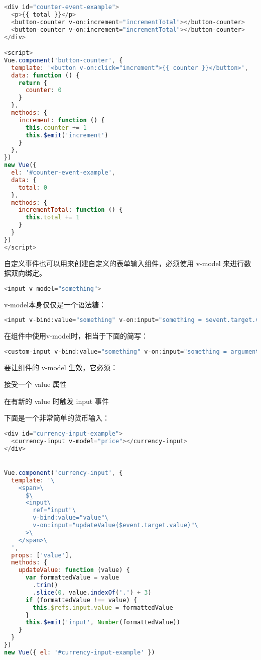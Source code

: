 \begin{lstlisting}[language=JavaScript]
<div id="counter-event-example">
  <p>{{ total }}</p>
  <button-counter v-on:increment="incrementTotal"></button-counter>
  <button-counter v-on:increment="incrementTotal"></button-counter>
</div>

<script>
Vue.component('button-counter', {
  template: '<button v-on:click="increment">{{ counter }}</button>',
  data: function () {
    return {
      counter: 0
    }
  },
  methods: {
    increment: function () {
      this.counter += 1
      this.$emit('increment')
    }
  },
})
new Vue({
  el: '#counter-event-example',
  data: {
    total: 0
  },
  methods: {
    incrementTotal: function () {
      this.total += 1
    }
  }
})
</script>
\end{lstlisting}



自定义事件也可以用来创建自定义的表单输入组件，必须使用 v-model 来进行数据双向绑定。


\begin{lstlisting}[language=JavaScript]
<input v-model="something">
\end{lstlisting}

v-model本身仅仅是一个语法糖：

\begin{lstlisting}[language=JavaScript]
<input v-bind:value="something" v-on:input="something = $event.target.value">
\end{lstlisting}

在组件中使用v-model时，相当于下面的简写：

\begin{lstlisting}[language=JavaScript]
<custom-input v-bind:value="something" v-on:input="something = arguments[0]"></custom-input>
\end{lstlisting}

要让组件的 v-model 生效，它必须：

\begin{compactitem}
\item 接受一个 value 属性
\item 在有新的 value 时触发 input 事件
\end{compactitem}

下面是一个非常简单的货币输入：

\begin{lstlisting}[language=JavaScript]
<div id="currency-input-example">
  <currency-input v-model="price"></currency-input>
</div>


Vue.component('currency-input', {
  template: '\
    <span>\
      $\
      <input\
        ref="input"\
        v-bind:value="value"\
        v-on:input="updateValue($event.target.value)"\
      >\
    </span>\
  ',
  props: ['value'],
  methods: {
    updateValue: function (value) {
      var formattedValue = value
        .trim()
        .slice(0, value.indexOf('.') + 3)
      if (formattedValue !== value) {
        this.$refs.input.value = formattedValue
      }
      this.$emit('input', Number(formattedValue))
    }
  }
})
new Vue({ el: '#currency-input-example' })
\end{lstlisting}


